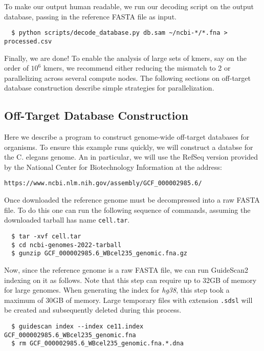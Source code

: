 \documentclass[10pt]{article}
\begin{document}
To make our output human readable, we run our decoding script on the
output database, passing in the reference FASTA file as input.
\vspace{-0.8em}
\begin{verbatim}
  $ python scripts/decode_database.py db.sam ~/ncbi-*/*.fna > processed.csv
\end{verbatim}

Finally, we are done! To enable the analysis of large sets of kmers,
say on the order of $10^6$ kmers, we recommend either reducing the
mismatch to 2 or parallelizing across several compute nodes. The
following sections on off-target database construction describe simple
strategies for parallelization.

\subsection{Off-Target Database Construction}
\label{subsec:offtargetdb}

Here we describe a program to construct genome-wide off-target
databases for organisms. To ensure this example runs quickly, we will
construct a databse for the C. elegans genome. An in particular, we
will use the RefSeq version provided by the National Center for
Biotechnology Information at the address:

\begin{center}
  \texttt{https://www.ncbi.nlm.nih.gov/assembly/GCF\_000002985.6/}
\end{center}

Once downloaded the reference genome must be decompressed into a raw
FASTA file.  To do this one can run the following sequence of
commands, assuming the downloaded tarball has name \texttt{cell.tar}.

\begin{verbatim}
  $ tar -xvf cell.tar
  $ cd ncbi-genomes-2022-tarball
  $ gunzip GCF_000002985.6_WBcel235_genomic.fna.gz
\end{verbatim}

Now, since the reference genome is a raw FASTA file, we can run
GuideScan2 indexing on it as follows. Note that this step can require
up to 32GB of memory for large genomes. When generating the index for
\textit{hg38}, this step took a maximum of 30GB of memory. Large
temporary files with extension \texttt{.sdsl} will be created and
subsequently deleted during this process.

\begin{verbatim}
  $ guidescan index --index ce11.index GCF_000002985.6_WBcel235_genomic.fna
  $ rm GCF_000002985.6_WBcel235_genomic.fna.*.dna
\end{verbatim}
\end{document}
